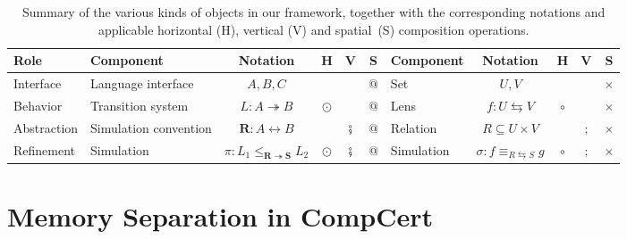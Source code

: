 \documentclass[acmsmall,screen,review,anonymous,nonacm]{acmart}
\newcommand{\lensarrow}{\leftrightarrows}
\newcommand{\vcomp}{\fatsemi}
\begin{document}
\begin{table} %
  \caption{
    Summary of
    the various kinds of objects in our framework,
    together with the corresponding notations
    and applicable horizontal (H), vertical (V) and spatial~(S)
    composition operations.
} \label{tbl:roadmap}
  \small
  \begin{tabular}{
    l lc c@{\,\:}c@{\:}c @{\quad\:} lc c@{\,\:}c@{\:}c
  }
    \toprule
    Role & Component & Notation & H & V & S
         & Component\hspace{-1em} & Notation & H & V & S
    \\
    \midrule
      Interface
        & Language interface & $A, B, C$
	& & & $\mathbin@$
        & Set & $U, V$
	& & & $\times$
    \\
      Behavior
        & Transition system & $L : A \twoheadrightarrow B$
	& $\odot$ & & $\mathbin@$
        & Lens & $f : U \lensarrow V$
	& $\circ$ & & $\times$
    \\
      Abstraction
        & Simulation convention \hspace{-1em} & $\mathbf{R} : A \leftrightarrow B$
	& & $\vcomp$ & $\mathbin@$
        & Relation & $R \subseteq U \times V$
	& & $\mathbin;$ & $\times$
    \\
      Refinement
        & Simulation &
          $\pi :
           L_1 \le_{\mathbf{R} \twoheadrightarrow \mathbf{S}} L_2$
        & $\odot$ & $\vcomp$ & $\mathbin@$
        & Simulation &
         $\sigma : f \equiv_{R \lensarrow S} g$
	& $\circ$ & $\mathbin;$ & $\times$
    \\
    \bottomrule
  \end{tabular}
\end{table}




\appendix

\newpage

\section{Memory Separation in CompCert} \label{app:sep} %

\end{document}
